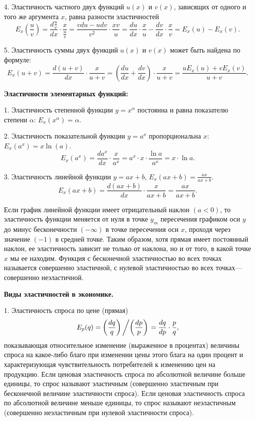 \documentclass[12pt,openbib]{report}
\begin{document}
4. Эластичность частного двух функций $u(x)$ и $v(x)$, зависящих от
одного и того же аргумента $x$, равна разности эластичностей
$$E_x\left(\frac uv\right)=\frac{d\frac uv}{dx}\cdot\frac x{\frac
uv}=\frac{vdu-udv}{v^2}\cdot\frac{xv}u=\frac{du}{dx}\cdot\frac
xu-\frac{dv}{dx}\cdot\frac xv=E_x(u)-E_x(v).$$

5. Эластичность суммы двух функций $u(x)$ и $v(x)$ может быть
найдена по формуле:
$$E_x(u+v)=\frac{d(u+v)}{dx}\cdot\frac
x{u+v}=\left(\frac{du}{dx}+\frac{dv}{dx}\right)\cdot\frac
x{u+v}=\frac{uE_x(u)+vE_x(v)}{u+v}.$$

{\bf Эластичности элементарных функций:}

1. Эластичность степенной функции $y=x^\alpha$ постоянна и равна
показателю степени $\alpha$: $E_x(x^\alpha)=\alpha$.

2. Эластичность показательной функции $y=a^x$ пропорциональна $x$:
$E_x(a^x)=x\ln(a)$.
$$E_x(a^x)=\frac{da^x}{dx}\cdot\frac x{a^x}=a^x\cdot x\cdot\frac{\ln
a}{a^x}=x\cdot\ln a.$$

3. Эластичность линейной функции $y=ax+b$,
$E_x(ax+b)=\frac{ax}{ax+b}$.
$$E_x(ax+b)=\frac{d(ax+b)}{dx}\cdot\frac x{ax+b}=\frac{ax}{ax+b}.$$

Если график линейной функции имеет отрицательный наклон $(a<0)$, то
эластичность функции меняется от нуля в точке $y_m$ пересечения
графиком оси $y$ до минус бесконечности $(-\infty)$ в точке
пересечения оси $x$, проходя через значение $(-1)$ в средней точке.
Таким образом, хотя прямая имеет постоянный наклон, ее эластичность
зависит не только от наклона, но и от того, в какой точке $x$ мы ее
находим. Функция с бесконечной эластичностью во всех точках
называется совершенно эластичной, с нулевой эластичностью во всех
точках--- совершенно неэластичной.

{\bf Виды эластичностей в экономике.}

1. Эластичность спроса по цене (прямая)
$$E_p(q)=\left(\frac{dq}q\right)\left/\left(\frac{dp}p\right)\right.=\frac{dq}{dp}\cdot\frac
pq,$$
показывающая относительное изменение (выраженное в процентах)
величины спроса на какое-либо благо при изменении цены этого блага
на один процент и характеризующая чувствительность потребителей к
изменению цен на продукцию. Если ценовая эластичность спроса по
абсолютной величине больше единицы, то спрос называют эластичным
(совершенно эластичным при бесконечной величине эластичности
спроса). Если ценовая эластичность спроса по абсолютной величине
меньше единицы, то спрос называют неэластичным (совершенно
неэластичным при нулевой эластичности спроса).
\end{document}
